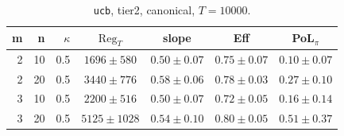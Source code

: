 \begin{table}[htbp]
\centering
\scriptsize
\caption{\texttt{ucb}, tier2, canonical, $T=10000$.}
\label{tab:tier2_long_ucb}
\begin{tabular}{@{}rrrcccc@{}}
\toprule
m & n & $\kappa$ & $\mathrm{Reg}_T$ & slope & Eff & PoL$_\pi$ \\
\midrule
2 & 10 & 0.5 & $1696 \pm 580$ & $0.50 \pm 0.07$ & $0.75 \pm 0.07$ & $0.10 \pm 0.07$ \\
2 & 20 & 0.5 & $3440 \pm 776$ & $0.58 \pm 0.06$ & $0.78 \pm 0.03$ & $0.27 \pm 0.10$ \\
\midrule
3 & 10 & 0.5 & $2200 \pm 516$ & $0.50 \pm 0.07$ & $0.72 \pm 0.05$ & $0.16 \pm 0.14$ \\
3 & 20 & 0.5 & $5125 \pm 1028$ & $0.54 \pm 0.10$ & $0.80 \pm 0.05$ & $0.51 \pm 0.37$ \\
\bottomrule
\end{tabular}
\end{table}
